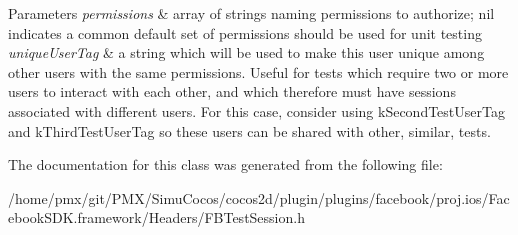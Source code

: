 \begin{DoxyParams}{Parameters}
{\em permissions} & array of strings naming permissions to authorize; nil indicates a common default set of permissions should be used for unit testing\\
\hline
{\em unique\+User\+Tag} & a string which will be used to make this user unique among other users with the same permissions. Useful for tests which require two or more users to interact with each other, and which therefore must have sessions associated with different users. For this case, consider using k\+Second\+Test\+User\+Tag and k\+Third\+Test\+User\+Tag so these users can be shared with other, similar, tests. \\
\hline
\end{DoxyParams}


The documentation for this class was generated from the following file\+:\begin{DoxyCompactItemize}
\item 
/home/pmx/git/\+P\+M\+X/\+Simu\+Cocos/cocos2d/plugin/plugins/facebook/proj.\+ios/\+Facebook\+S\+D\+K.\+framework/\+Headers/F\+B\+Test\+Session.\+h\end{DoxyCompactItemize}
